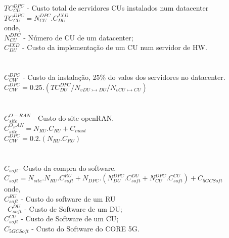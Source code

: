 \documentclass[t]{beamer}
\begin{document}
{ \begin{frame}
 	\footnotesize
 	$TC_{CU}^{DPC} $ - Custo total de servidores CUs instalados num datacenter\\
\hspace{1cm}
 	$TC_{CU}^{DPC} = N_{CU}^{DPC}.C_{DU}^{IXD}$\\
 onde, \\
 $N_{CU}^{DPC}$ - Número de CU de um datacenter;\\
 $C_{DU}^{IXD}$ - Custo da implementação de um CU num servidor de HW.\\
\\~\\
\hspace{1cm}
 $C_{CW}^{DPC}$ - Custo da instalação, 25\% do valos dos servidores no datacenter.\\
 $C_{CW}^{DPC} = 0.25.(TC_{DU}^{DPC}/N_{vDU \rightarrowtail DU}/N_{vCU \rightarrowtail CU})$\\
\\~\\
 $C_{site}^{O-RAN}$ - Custo do site openRAN.\\
 \hspace{1cm}
 $C_{site}^{O_RAN}=N_{RU}.C_{RU}+C_{mast}$\\
  $C_{CW}^{DPC}=0.2.(N_{RU}.C_{RU})$\\
  \\~\\
  $C_{soft} $-  Custo da compra do software.\\
  $C_{soft}=N_{site}.N_{RU}.C_{soft}^{RU}+N_{DPC}.(N_{DU}^{DPC}.C_{soft}^{DU}+N_{CU}^{DPC}.C_{soft}^{CU})+C_{5GCSoft}$\\
onde,\\
$C_{soft}^{RU}$ - Custo do software de um RU\\\
$C_{soft}^{DU}$ - Custo de Software de um DU;\\
$C_{soft}^{CU}$ - Custo de Software de um CU;\\
$C_{5GCSoft}$ - Custo do Software do CORE 5G.\\
 \end{frame}
 
 
}
\end{document}
